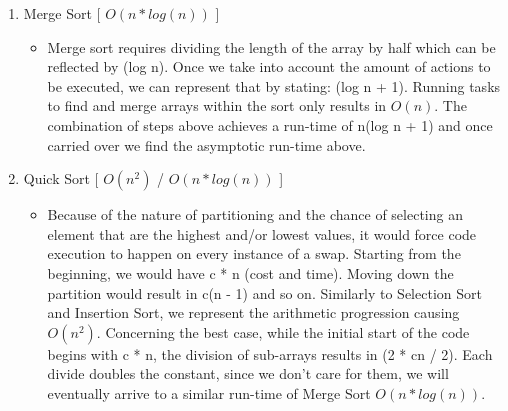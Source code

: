 \documentclass[letterpaper, 10pt,DIV=13]{scrartcl}
\numberwithin{equation}{section} %
\numberwithin{figure}{section} %
\numberwithin{table}{section} %
\begin{document}
\begin{enumerate}
   \item Merge Sort [ $O(n * log(n))$ ]
    \begin{itemize}
        \item Merge sort requires dividing the length of the array by half which can be reflected by (log n). Once we take into account the amount of actions to be executed, we can represent that by stating: (log n + 1). Running tasks to find and merge arrays within the sort only results in $O(n)$. The combination of steps above achieves a run-time of n(log n + 1) and once carried over we find the asymptotic run-time above.  
    \end{itemize}
    \bigskip
    \item Quick Sort [ $O(n^2)$ / $O(n * log(n))$ ]
    \begin{itemize}
        \item Because of the nature of partitioning and the chance of selecting an element that are the highest and/or lowest values, it would force code execution to happen on every instance of a swap. Starting from the beginning, we would have c * n (cost and time). Moving down the partition would result in c(n - 1) and so on. Similarly to Selection Sort and Insertion Sort, we represent the arithmetic progression causing $O(n^2)$. Concerning the best case, while the initial start of the code begins with c * n, the division of sub-arrays results in (2 * cn / 2). Each divide doubles the constant, since we don't care for them, we will eventually arrive to a similar run-time of Merge Sort $O(n * log(n))$.  
    \end{itemize}
\end{enumerate}
\end{document}
